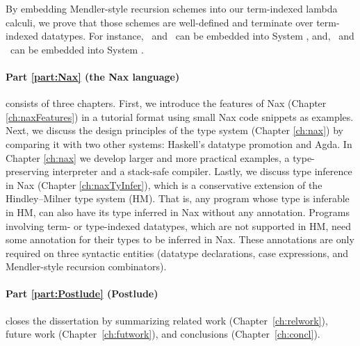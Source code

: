 By embedding Mendler-style recursion schemes into our term-indexed
lambda calculi, we prove that those schemes are well-defined and
terminate over term-indexed datatypes.  For instance,
\MIt\ and \MsfIt\ can be embedded into System \Fi,
and, \MPr\ and \McvPr\ can be embedded into System \Fixi.

\paragraph{Part \ref{part:Nax} (the Nax language)}\hspace{-1em} consists of
three chapters.
First, we introduce the features of Nax (Chapter \ref{ch:naxFeatures})
in a tutorial format using small Nax code snippets as examples.
Next, we discuss the design principles of the type system (Chapter \ref{ch:nax})
by comparing it with two other systems: Haskell's datatype promotion and Agda.
In Chapter \ref{ch:nax} we develop
larger and more practical examples,
a type-preserving interpreter and a stack-safe compiler.
Lastly, we discuss type inference in Nax (Chapter \ref{ch:naxTyInfer}),
which is a conservative extension of the Hindley--Milner type system (HM).
That is, any program whose type is inferable in HM, can also have its type
inferred in Nax without any annotation. Programs involving
term- or type-indexed datatypes, which are not supported in HM, need
some annotation for their types to be inferred in Nax. These annotations
are only required on three syntactic entities (datatype declarations,
case expressions, and Mendler-style recursion combinators).

\paragraph{Part \ref{part:Postlude} (Postlude)}\hspace{-1em} closes
the dissertation by summarizing
  related work (Chapter~\ref{ch:relwork}),
  future work (Chapter~\ref{ch:futwork}), and
  conclusions (Chapter~\ref{ch:concl}).

